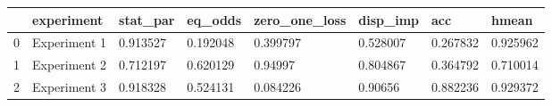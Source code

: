 \begin{tabular}{llllllll}
\toprule
{} &    experiment &  stat\_par &   eq\_odds & zero\_one\_loss &  disp\_imp &       acc &     hmean \\
\midrule
0 &  Experiment 1 &  0.913527 &  0.192048 &      0.399797 &  0.528007 &  0.267832 &  0.925962 \\
1 &  Experiment 2 &  0.712197 &  0.620129 &       0.94997 &  0.804867 &  0.364792 &  0.710014 \\
2 &  Experiment 3 &  0.918328 &  0.524131 &      0.084226 &   0.90656 &  0.882236 &  0.929372 \\
\bottomrule
\end{tabular}
